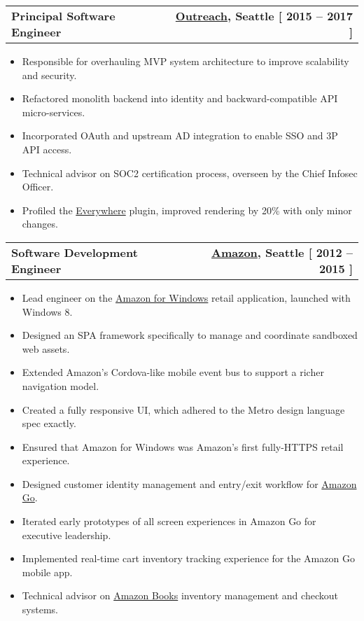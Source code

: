 \documentclass[12pt]{article}
\makeatletter
\newenvironment{justifycolumns}
{\begin{tabular*}{\textwidth}{@{\extracolsep{\fill}} lr@{}}}
{\end{tabular*}}
\newcommand{\row}[2]{#1 & #2 \\}
\newcommand{\rowheading}[2]{\row{\textbf{#1}}{\textbf{#2}}}
\newcommand{\range}[2]{#1 -- #2}
\newcommand{\blockseparation}{\vspace{0.13in}}
\newenvironment{tightbullets}
{\begin{itemize}}
{\end{itemize}}
\newenvironment{bullets}
{\begin{tightbullets}}
{\end{tightbullets} \blockseparation}
\makeatother
\begin{document}
\begin{flushleft}
\begin{justifycolumns}
	\hspace{0.1in}
	\rowheading{Principal Software Engineer}{\textnormal{\href{https://outreach.io}{Outreach}, Seattle [ \range{2015}{2017} ]}}
\end{justifycolumns}
\begin{bullets}
	\item Responsible for overhauling MVP system architecture to improve scalability and security.
	\item Refactored monolith backend into identity and backward-compatible API micro-services.
	\item Incorporated OAuth and upstream AD integration to enable SSO and 3P API access.
	\item Technical advisor on SOC2 certification process, overseen by the Chief Infosec Officer.
	\item Profiled the \href{https://chrome.google.com/webstore/detail/outreach-everywhere/chmpifjjfpeodjljjadlobceoiflhdid}{Everywhere} plugin, improved rendering by 20\% with only minor changes.
\end{bullets}
\vspace{0.05in}

\begin{justifycolumns}
	\hspace{0.1in}
	\rowheading{Software Development Engineer}{\textnormal{\href{https://amazon.com}{Amazon}, Seattle [ \range{2012}{2015} ]}}
\end{justifycolumns}
\begin{bullets}
	\item Lead engineer on the \href{https://blogs.microsoft.com/ai/amazon-app-for-windows-8/}{Amazon for Windows} retail application, launched with Windows 8.
	\item Designed an SPA framework specifically to manage and coordinate sandboxed web assets.
	\item Extended Amazon’s Cordova-like mobile event bus to support a richer navigation model.
	\item Created a fully responsive UI, which adhered to the Metro design language spec exactly.
	\item Ensured that Amazon for Windows was Amazon's first fully-HTTPS retail experience.
	\item Designed customer identity management and entry/exit workflow for \href{https://www.amazon.com/b?ie=UTF8\&node=16008589011}{Amazon Go}.
	\item Iterated early prototypes of all screen experiences in Amazon Go for executive leadership.
	\item Implemented real-time cart inventory tracking experience for the Amazon Go mobile app.
	\item Technical advisor on \href{https://www.amazon.com/amazon-books-university-village-seattle-washington/b?ie=UTF8\&node=17750359011}{Amazon Books} inventory management and checkout systems.
\end{bullets}
\vspace{0.05in}


\end{flushleft}
\end{document}

